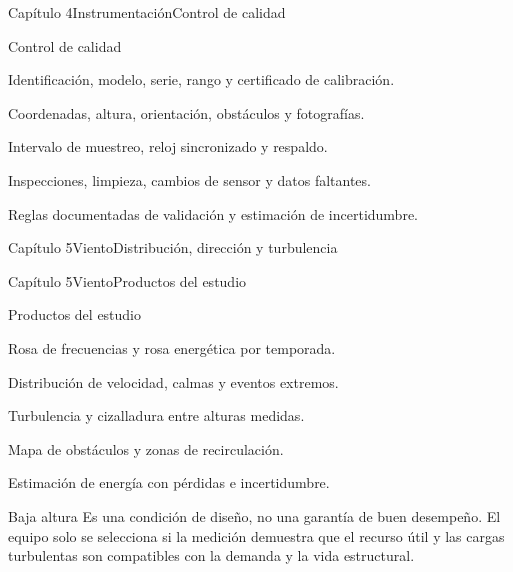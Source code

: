 \documentclass{../plantilla/hvtbook}
\begin{document}
\begin{HVTPage}{Capítulo 4}{Instrumentación}{Control de calidad}
\begin{HVTTask}{Control de calidad}
  \item Identificación, modelo, serie, rango y certificado de calibración.
  \item Coordenadas, altura, orientación, obstáculos y fotografías.
  \item Intervalo de muestreo, reloj sincronizado y respaldo.
  \item Inspecciones, limpieza, cambios de sensor y datos faltantes.
  \item Reglas documentadas de validación y estimación de incertidumbre.
\end{HVTTask}
\end{HVTPage}

\begin{HVTPage}{Capítulo 5}{Viento}{Distribución, dirección y turbulencia}
\end{HVTPage}

\begin{HVTPage}{Capítulo 5}{Viento}{Productos del estudio}
\begin{HVTTask}{Productos del estudio}
  \item Rosa de frecuencias y rosa energética por temporada.
  \item Distribución de velocidad, calmas y eventos extremos.
  \item Turbulencia y cizalladura entre alturas medidas.
  \item Mapa de obstáculos y zonas de recirculación.
  \item Estimación de energía con pérdidas e incertidumbre.
\end{HVTTask}
\begin{HVTWarning}{Baja altura}
Es una condición de diseño, no una garantía de buen desempeño. El equipo solo se selecciona si la medición demuestra que el recurso útil y las cargas turbulentas son compatibles con la demanda y la vida estructural.
\end{HVTWarning}
\end{HVTPage}
\end{document}
